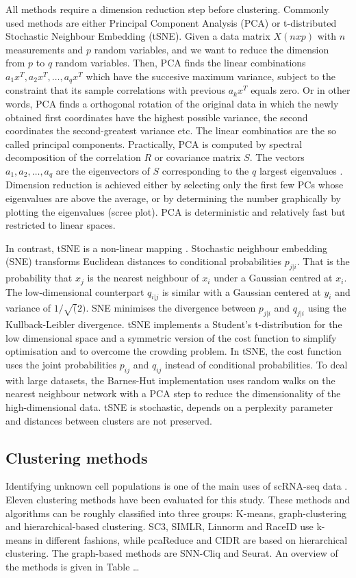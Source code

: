 \documentclass[12pt, a4paper]{article}\usepackage[]{graphicx}\usepackage[]{color}
\begin{document}
All methods require a dimension reduction step before clustering. Commonly used methods are either Principal Component Analysis (PCA) \citep{hotelling1933analysis} or t-distributed Stochastic Neighbour Embedding (tSNE). Given a data matrix $X (nxp)$ with $n$ measurements and $p$ random variables, and we want to reduce the dimension from $p$ to $q$ random variables. Then, PCA finds the linear combinations $a_{1}x^T, a_{2}x^T,\ldots, a_{q}x^T$ which have the succesive maximum variance, subject to the constraint that its sample correlations with previous $a_{k}x^T$ equals zero.
Or in other words, PCA finds a orthogonal rotation of the original data in which the newly obtained first coordinates have the highest possible variance, the second coordinates the second-greatest variance etc. The linear combinatios are the so called principal components.
Practically, PCA is computed by spectral decomposition of the correlation $R$ or covariance matrix $S$. The vectors $a_{1}, a_{2},\ldots, a_{q}$ are the eigenvectors of $S$ corresponding to the $q$ largest eigenvalues \citep{jolliffe1986principal}.  Dimension reduction is achieved either by selecting only the first few PCs whose eigenvalues are above the average, or by determining the number graphically by plotting the eigenvalues (scree plot). PCA is deterministic and relatively fast but restricted to linear spaces.

In contrast,  tSNE is a non-linear mapping \citep{van2013barnes}. Stochastic neighbour embedding (SNE) transforms Euclidean distances to conditional probabilities $p_{j|i}$. That is the probability that \(x_j\) is the nearest neighbour of $x_i$ under a Gaussian centred at $x_i$. The low-dimensional counterpart $q_{i|j}$ is similar with a Gaussian centered at $y_i$ and variance of $1/\sqrt(2)$. SNE minimises the divergence between $p_{j|i}$ and $q_{j|i}$ using the Kullback-Leibler divergence. tSNE implements a Student's t-distribution for the low dimensional space and a symmetric version of the cost function to simplify optimisation and to overcome the crowding problem. In tSNE, the cost function uses the joint probabilities $p_{ij}$ and $q_{ij}$ instead of conditional probabilities. To deal with large datasets, the Barnes-Hut implementation uses random walks on the nearest neighbour network with a PCA step to reduce the dimensionality of the high-dimensional data. tSNE is stochastic, depends on a perplexity parameter and distances between clusters are not preserved. 
\subsection{Clustering methods}
Identifying unknown cell populations is one of the main uses of scRNA-seq data \citep{andrews2017identifying}. Eleven clustering methods have been evaluated for this study. These methods and algorithms can be roughly classified into three groups: K-means, graph-clustering and hierarchical-based clustering. 
SC3, SIMLR, Linnorm and RaceID use k-means in different fashions, while pcaReduce and CIDR are based on hierarchical clustering. The graph-based methods are SNN-Cliq and Seurat. An overview of the methods is given in Table \dots
\end{document}
